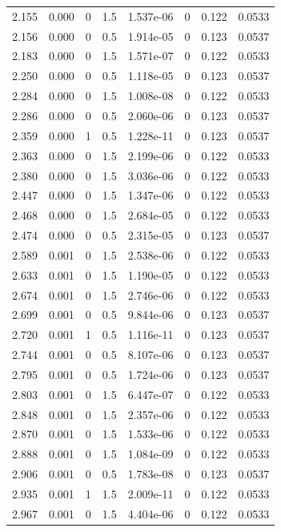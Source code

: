 \documentclass[preview]{standalone}
\begin{document}
{{{\begin{tabular}{L{1.2cm}C{1.2cm} C{0.3cm}C{0.5cm} C{1.4cm}C{1.4cm} C{1.4cm}C{1.4cm}}
  2.155  &  0.000  & 0     & 1.5 &  1.537e-06  & 0  & 0.122 &  0.0533   \\ 
  2.156  &  0.000  & 0     & 0.5 &  1.914e-05  & 0  & 0.123 &  0.0537   \\ 
  2.183  &  0.000  & 0     & 1.5 &  1.571e-07  & 0  & 0.122 &  0.0533   \\ 
  2.250  &  0.000  & 0     & 0.5 &  1.118e-05  & 0  & 0.123 &  0.0537   \\ 
  2.284  &  0.000  & 0     & 1.5 &  1.008e-08  & 0  & 0.122 &  0.0533   \\ 
  2.286  &  0.000  & 0     & 0.5 &  2.060e-06  & 0  & 0.123 &  0.0537   \\ 
  2.359  &  0.000  & 1     & 0.5 &  1.228e-11  & 0  & 0.123 &  0.0537   \\ 
  2.363  &  0.000  & 0     & 1.5 &  2.199e-06  & 0  & 0.122 &  0.0533   \\ 
  2.380  &  0.000  & 0     & 1.5 &  3.036e-06  & 0  & 0.122 &  0.0533   \\ 
  2.447  &  0.000  & 0     & 1.5 &  1.347e-06  & 0  & 0.122 &  0.0533   \\ 
  2.468  &  0.000  & 0     & 1.5 &  2.684e-05  & 0  & 0.122 &  0.0533   \\ 
  2.474  &  0.000  & 0     & 0.5 &  2.315e-05  & 0  & 0.123 &  0.0537   \\ 
  2.589  &  0.001  & 0     & 1.5 &  2.538e-06  & 0  & 0.122 &  0.0533   \\ 
  2.633  &  0.001  & 0     & 1.5 &  1.190e-05  & 0  & 0.122 &  0.0533   \\ 
  2.674  &  0.001  & 0     & 1.5 &  2.746e-06  & 0  & 0.122 &  0.0533   \\ 
  2.699  &  0.001  & 0     & 0.5 &  9.844e-06  & 0  & 0.123 &  0.0537   \\ 
  2.720  &  0.001  & 1     & 0.5 &  1.116e-11  & 0  & 0.123 &  0.0537   \\ 
  2.744  &  0.001  & 0     & 0.5 &  8.107e-06  & 0  & 0.123 &  0.0537   \\ 
  2.795  &  0.001  & 0     & 0.5 &  1.724e-06  & 0  & 0.123 &  0.0537   \\ 
  2.803  &  0.001  & 0     & 1.5 &  6.447e-07  & 0  & 0.122 &  0.0533   \\ 
  2.848  &  0.001  & 0     & 1.5 &  2.357e-06  & 0  & 0.122 &  0.0533   \\ 
  2.870  &  0.001  & 0     & 1.5 &  1.533e-06  & 0  & 0.122 &  0.0533   \\ 
  2.888  &  0.001  & 0     & 1.5 &  1.084e-09  & 0  & 0.122 &  0.0533   \\ 
  2.906  &  0.001  & 0     & 0.5 &  1.783e-08  & 0  & 0.123 &  0.0537   \\ 
  2.935  &  0.001  & 1     & 1.5 &  2.009e-11  & 0  & 0.122 &  0.0533   \\ 
  2.967  &  0.001  & 0     & 1.5 &  4.404e-06  & 0  & 0.122 &  0.0533   \\ 
\hline 
\end{tabular} 

}}}
\end{document}
